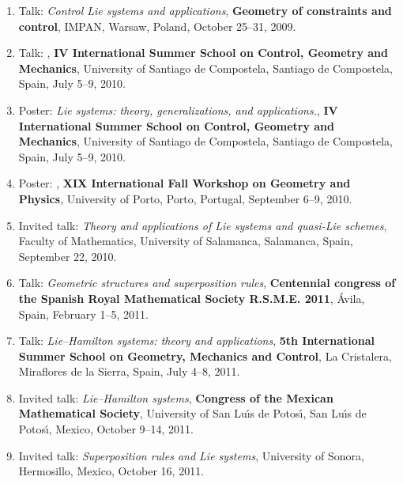 \documentclass[12pt,reqno]{amsbook}
\begin{document}
\begin{enumerate}
\item Talk: {\it Control Lie systems and applications}, {\bf Geometry of constraints and control}, IMPAN, Warsaw, Poland,  October 25--31, 2009.

\item Talk: , {\bf IV International Summer School on Control, Geometry and Mechanics}, University of Santiago de Compostela, Santiago de Compostela, Spain, July 5--9, 2010.

\item Poster: \!\! {\it Lie systems:\! theory, generalizations, and applications.}, {\bf  IV International Summer School on Control, Geometry and Mechanics}, University of Santiago de Compostela, Santiago de Compostela, Spain, July 5--9, 2010.

\item Poster: , {\bf XIX International Fall Workshop on Geometry and Physics}, University of Porto, Porto, Portugal, September 6--9, 2010.


\item Invited talk: {\it Theory and applications of Lie systems and quasi-Lie schemes}, Faculty of Mathematics, University of Salamanca, Salamanca, Spain, September 22, 2010. 

\item Talk: {\it Geometric structures and superposition rules}, {\bf Centennial congress of the Spanish Royal Mathematical Society R.S.M.E. 2011}, \'Avila, Spain, February 1--5, 2011.

\item Talk: {\it Lie--Hamilton systems: theory and applications}, {\bf 5th International Summer School on Geometry, Mechanics and Control}, La Cristalera, Miraflores de la Sierra, Spain, July  4--8, 2011.


\item Invited talk: {\it Lie--Hamilton systems}, {\bf Congress of the Mexican Mathematical Society}, University of  San Lu\'\i{}s de Potos\'\i{}, San Lu\'\i{}s de Potos\'\i{}, Mexico, October 9--14, 2011.

\item Invited talk: {\it  Superposition rules and Lie systems}, University of Sonora, Hermosillo, Mexico, October 16, 2011.


\end{enumerate}
\end{document}
